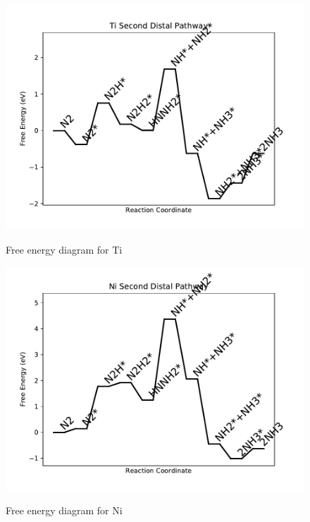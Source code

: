 \documentclass[journal=jacsat,manuscript=article]{achemso}
\begin{document}
\begin{figure}
\includegraphics[width=1\linewidth]{data/plots/Ti_distal_2.pdf}
\label{fig:Ti_distal_2}
\caption{Free energy diagram for Ti}
\end{figure}

\newpage
\begin{figure}
\includegraphics[width=1\linewidth]{data/plots/Ni_distal_2.pdf}
\label{fig:Ni_distal_2}
\caption{Free energy diagram for Ni}
\end{figure}
\end{document}
